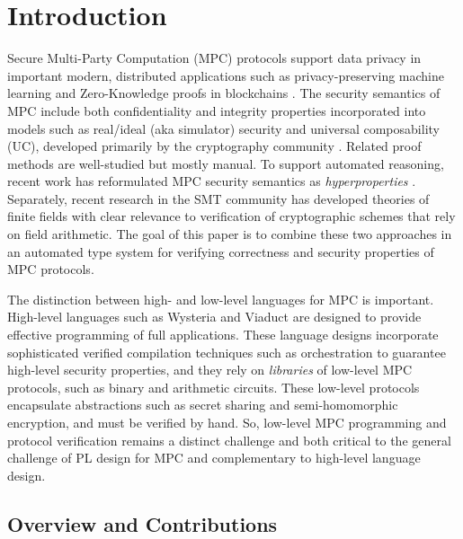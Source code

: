 \section{Introduction}

Secure Multi-Party Computation (MPC) protocols support data privacy in
important modern, distributed applications such as privacy-preserving
machine learning
\cite{li2021privacy,knott2021crypten,koch2020privacy,liu2020privacy}
and Zero-Knowledge proofs in blockchains
\cite{ishai2009zero,lu2019honeybadgermpc,gao2022symmeproof,tomaz2020preserving}.
The security semantics of MPC include both confidentiality and
integrity properties incorporated into models such as real/ideal (aka
simulator) security and universal composability (UC), developed
primarily by the cryptography community \cite{evans2018pragmatic}.
Related proof methods are well-studied \cite{Lindell2017} but mostly
manual. To support automated reasoning, recent work has reformulated
MPC security semantics as \emph{hyperproperties}
\cite{8429300,10.1145/3453483.3454074,skalka-near-ppdp24}.
Separately, recent research in the SMT community has developed
theories of finite fields \cite{SMFF} with clear relevance to
verification of cryptographic schemes that rely on field
arithmetic. The goal of this paper is to combine these two approaches
in an automated type system for verifying correctness and security
properties of MPC protocols.

The distinction between high- and low-level languages for MPC is
important. High-level languages such as Wysteria
\cite{rastogi2014wysteria} and Viaduct \cite{10.1145/3453483.3454074}
are designed to provide effective programming of full
applications. These language designs incorporate sophisticated
verified compilation techniques such as orchestration
\cite{viaduct-UC} to guarantee high-level security properties, and
they rely on \emph{libraries} of low-level MPC protocols, such as
binary and arithmetic circuits. These low-level protocols encapsulate
abstractions such as secret sharing and semi-homomorphic encryption,
and must be verified by hand. So, low-level MPC
programming and protocol verification remains a distinct challenge and both
critical to the general challenge of PL design for MPC and
complementary to high-level language design.

\subsection{Overview and Contributions}

